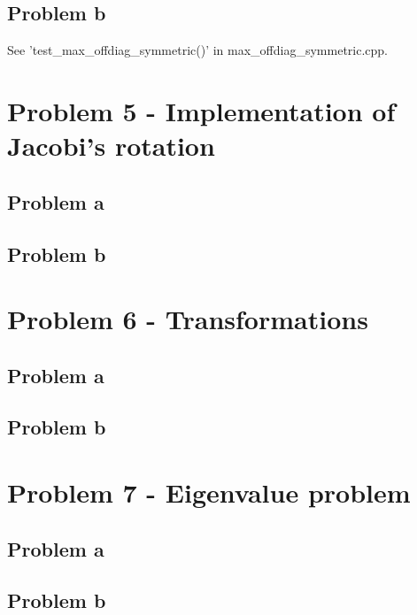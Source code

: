 \documentclass[english,notitlepage]{revtex4-1}  %
\begin{document}
\subsection*{Problem b}
See 'test\_max\_offdiag\_symmetric()' in max\_offdiag\_symmetric.cpp.

\section*{Problem 5 - Implementation of Jacobi’s rotation }

\subsection*{Problem a}

\subsection*{Problem b}


\section*{Problem 6 - Transformations}

\subsection*{Problem a}

\subsection*{Problem b}


\section*{Problem 7 - Eigenvalue problem}

\subsection*{Problem a}

\subsection*{Problem b}
\end{document}
